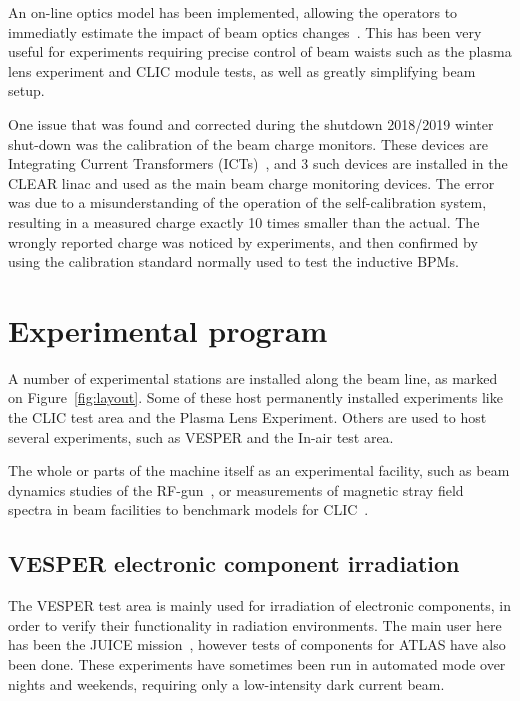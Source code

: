 \documentclass[a4paper,
               keeplastbox,   %
               ]{jacow}
\begin{document}

An on-line optics model has been implemented, allowing the operators to immediatly estimate the impact of beam optics changes~\cite{Erik::CLEARrev}.
This has been very useful for experiments requiring precise control of beam waists such as the plasma lens experiment and CLIC module tests, as well as greatly simplifying beam setup.

One issue that was found and corrected during the shutdown 2018/2019 winter shut-down was the calibration of the beam charge monitors.
These devices are Integrating Current Transformers (ICTs)~\cite{BergozICT}, and 3 such devices are installed in the CLEAR linac and used as the main beam charge monitoring devices.
The error was due to a misunderstanding of the operation of the self-calibration system, resulting in a measured charge exactly 10 times smaller than the actual.
The wrongly reported charge was noticed by experiments, and then confirmed by using the calibration standard normally used to test the inductive BPMs.

\section{Experimental program}

A number of experimental stations are installed along the beam line, as marked on Figure~\ref{fig:layout}.
Some of these host permanently installed experiments like the CLIC test area and the Plasma Lens Experiment.
Others are used to host several experiments, such as VESPER and the In-air test area.

The whole or parts of the machine itself as an experimental facility, such as beam dynamics studies of the RF-gun~\cite{LucaGun}, or measurements of magnetic stray field spectra in beam facilities to benchmark models for CLIC~\cite{Gohil:IPAC19-MOPGW081}.

\subsection{VESPER electronic component irradiation}
The VESPER test area is mainly used for irradiation of electronic components, in order to verify their functionality in radiation environments.
The main user here has been the JUICE mission~\cite{MarisTali:E-SEU,MarisTali:E-SEL,RubenAlia::CLEARrev}, however tests of components for ATLAS have also been done.
These experiments have sometimes been run in automated mode over nights and weekends, requiring only a low-intensity dark current beam.
\end{document}
